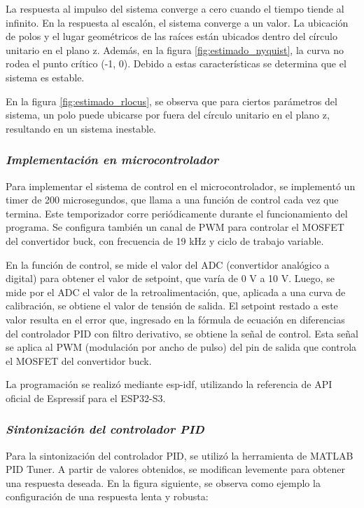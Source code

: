 La respuesta al impulso del sistema converge a cero cuando el tiempo tiende al infinito.
En la respuesta al escalón, el sistema converge a un valor.
La ubicación de polos y el lugar geométricos de las raíces están ubicados dentro 
del círculo unitario en el plano z. Además, en la figura \ref{fig:estimado_nyquist}, la curva no rodea
el punto crítico (-1, 0). Debido a estas características se determina que el sistema es estable.

En la figura \ref{fig:estimado_rlocus}, se observa que para ciertos parámetros del sistema, un polo puede
ubicarse por fuera del círculo unitario en el plano z, resultando en un sistema inestable.

\subsubsection*{\it{Implementación en microcontrolador}}
\vspace{-0.25cm}

Para implementar el sistema de control en el microcontrolador, se implementó un timer de 200 microsegundos,
que llama a una función de control cada vez que termina. Este temporizador corre periódicamente durante el funcionamiento
del programa. Se configura también un canal de PWM para controlar el MOSFET del convertidor buck, con frecuencia de 19 kHz
y ciclo de trabajo variable.

En la función de control, se mide el valor del ADC (convertidor analógico a digital) para obtener el
valor de setpoint, que varía de 0 V a 10 V. Luego, se mide por el ADC el valor de la retroalimentación, que, aplicada
a una curva de calibración, se obtiene el valor de tensión de salida. El setpoint restado a este valor resulta en
el error que, ingresado en la fórmula de ecuación en diferencias del controlador PID con filtro derivativo, se obtiene
la señal de control. Esta señal se aplica al PWM (modulación por ancho de pulso) del pin de salida que controla
el MOSFET del convertidor buck.

La programación se realizó mediante esp-idf, utilizando la referencia de API oficial de Espressif para el ESP32-S3. \parencite{ESPIDF}

\subsubsection*{\it{Sintonización del controlador PID}}
\vspace{-0.25cm}

Para la sintonización del controlador PID, se utilizó la herramienta de MATLAB PID Tuner. A partir de valores obtenidos,
se modifican levemente para obtener una respuesta deseada. En la figura siguiente, se observa como ejemplo la configuración
de una respuesta lenta y robusta:

